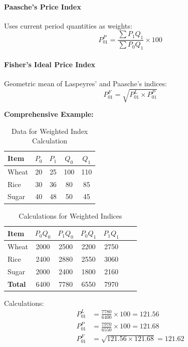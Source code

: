 \documentclass[twoside]{book}
\begin{document}
\paragraph{Paasche's Price Index}
Uses current period quantities as weights:
\begin{equation}
    P_{01}^P = \frac{\sum P_1 Q_1}{\sum P_0 Q_1} \times 100
\end{equation}

\paragraph{Fisher's Ideal Price Index}
Geometric mean of Laspeyres' and Paasche's indices:
\begin{equation}
    P_{01}^F = \sqrt{P_{01}^L \times P_{01}^P}
\end{equation}

\textbf{Comprehensive Example:}

\begin{table}[h]
\centering
\caption{Data for Weighted Index Calculation}
\begin{tabular}{lcccc}
\toprule
\textbf{Item} & $P_0$ & $P_1$ & $Q_0$ & $Q_1$ \\
\midrule
Wheat & 20 & 25 & 100 & 110 \\
Rice & 30 & 36 & 80 & 85 \\
Sugar & 40 & 48 & 50 & 45 \\
\bottomrule
\end{tabular}
\end{table}

\begin{table}[h]
\centering
\caption{Calculations for Weighted Indices}
\begin{tabular}{lcccccc}
\toprule
\textbf{Item} & $P_0Q_0$ & $P_1Q_0$ & $P_0Q_1$ & $P_1Q_1$ \\
\midrule
Wheat & 2000 & 2500 & 2200 & 2750 \\
Rice & 2400 & 2880 & 2550 & 3060 \\
Sugar & 2000 & 2400 & 1800 & 2160 \\
\midrule
\textbf{Total} & 6400 & 7780 & 6550 & 7970 \\
\bottomrule
\end{tabular}
\end{table}

Calculations:
\begin{align}
    P_{01}^L &= \frac{7780}{6400} \times 100 = 121.56 \\
    P_{01}^P &= \frac{7970}{6550} \times 100 = 121.68 \\
    P_{01}^F &= \sqrt{121.56 \times 121.68} = 121.62
\end{align}
\end{document}
